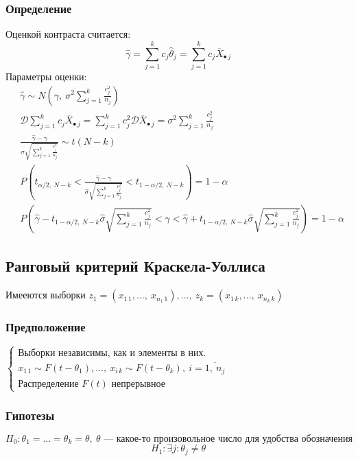 \documentclass[12pt, a4paper]{article}
\newcommand{\dev}{\mathcal{D}}
\begin{document}
\subsubsection*{Определение}
Оценкой контраста считается:
\[\hat \gamma = \sum_{j = 1}^{k} c_j \hat \theta_j = \sum_{j = 1}^{k} c_j \overline{X}_{\bullet\, j}\]
Параметры оценки:
\begin{equation*}
    \begin{aligned}
        &\hat \gamma \sim N\left(\gamma,\ \sigma^2 \sum_{j = 1}^{k} \frac{c_j^2}{n_j}\right)\\
        &\dev \sum_{j = 1}^{k} c_j \overline{X}_{\bullet\, j} = \sum_{j = 1}^{k} c_j^2 \dev \overline{X}_{\bullet\, j} = \sigma^2 \sum_{j = 1}^k \frac{c_j^2}{n_j}\\
        & \frac{\hat \gamma - \gamma}{\sigma \sqrt{\sum_{j = 1}^k \frac{c_j^2}{n_j}}} \sim t(N - k)\\
        & P\left( t_{\alpha/2,\ N - k} < \frac{\hat \gamma - \gamma}{\hat \sigma \sqrt{\sum_{j = 1}^k \frac{c_j^2}{n_j}}} < t_{1 - \alpha/2,\ N- k } \right) = 1 - \alpha\\
        & P\left(\hat \gamma -  t_{1 - \alpha/2,\ N - k} \hat \sigma\sqrt{\sum_{j = 1}^{k} \frac{c_j^2}{n_j}} < \gamma < \hat \gamma +  t_{1 - \alpha/2,\ N - k} \hat \sigma\sqrt{\sum_{j = 1}^{k} \frac{c_j^2}{n_j}}\right) = 1 - \alpha
    \end{aligned}
\end{equation*}
\subsection*{Ранговый критерий Краскела-Уоллиса}
Имееются выборки $z_1 = (x_{1\, 1},\dots,\ x_{n_1\, 1}),\dots,\ z_k = (x_{1\, k},\dots,\ x_{n_k\, k})$
\subsubsection*{Предположение}
$\begin{cases}
    \text{Выборки независимы, как и элементы в них.}\\
    x_{1\, 1} \sim F(t - \theta_1),\dots,\ x_{i\, k} \sim F(t - \theta_k),\ i = \overline{1,\ n_j}\\
    \text{Распределение $F(t)$ непрерывное}
\end{cases}$
\subsubsection*{Гипотезы}
\[H_0: \theta_1 = \dots = \theta_k = \theta,\ \text{$\theta$ --- какое-то произовольное число для удобства обозначения}\]
\[H_1: \exists j: \theta_j \neq \theta\]
\end{document}
